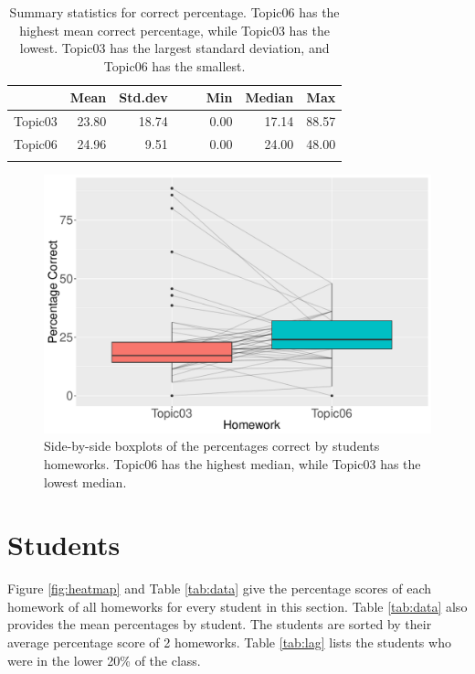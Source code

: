 \documentclass[12pt,nohyper]{tufte-handout}\usepackage[]{graphicx}\usepackage[]{color}
\begin{document}
\begin{longtable}{rrrrrrrr}
  \hline
 & Mean & Std.dev &   &   & Min & Median & Max \\ 
  \hline
Topic03 & 23.80 & 18.74 &  &  & 0.00 & 17.14 & 88.57 \\ 
  Topic06 & 24.96 & 9.51 &  &  & 0.00 & 24.00 & 48.00 \\ 
   \hline
\hline
\caption{Summary statistics for correct percentage. Topic06 has the highest mean correct percentage, while Topic03 has the lowest. Topic03 has the largest standard deviation, and Topic06 has the smallest.} 
\label{tab:summary}
\end{longtable}


\clearpage

\begin{center}
\begin{figure}
\begin{centering}
\includegraphics[width=0.9\linewidth]{Stat101_SectionAB_boxplotbystu}
\par\end{centering}
\caption{\label{fig:boxplot}Side-by-side boxplots of the percentages correct by students homeworks. Topic06 has the highest median, while Topic03 has the lowest median.}
\end{figure}\par\end{center}

\clearpage
\newpage{}
\section{Students}

Figure \ref{fig:heatmap} and Table \ref{tab:data} give the percentage
scores of each homework of all homeworks for every student in this section.
Table \ref{tab:data} also provides the mean percentages by student.
The students are sorted by their average percentage score of 2
homeworks. Table \ref{tab:lag} lists the students who were in the lower
20\% of the class.
\end{document}
